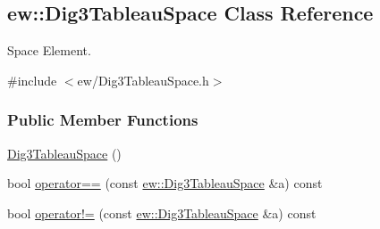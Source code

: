 \hypertarget{classew_1_1Dig3TableauSpace}{
\subsection{ew::Dig3TableauSpace Class Reference}
\label{classew_1_1Dig3TableauSpace}
}


Space Element.  




{\ttfamily \#include $<$ew/Dig3TableauSpace.h$>$}

\subsubsection*{Public Member Functions}
\begin{DoxyCompactItemize}
\item 
\hyperlink{classew_1_1Dig3TableauSpace_a82bcfb4842d1cde423f09731a2d6779b}{Dig3TableauSpace} ()
\item 
bool \hyperlink{classew_1_1Dig3TableauSpace_ade4aa56a4d3987c668b2cf17241ca15a}{operator==} (const \hyperlink{classew_1_1Dig3TableauSpace}{ew::Dig3TableauSpace} \&a) const 
\item 
bool \hyperlink{classew_1_1Dig3TableauSpace_ae968e6859c383ca24abfebce7c5ae567}{operator!=} (const \hyperlink{classew_1_1Dig3TableauSpace}{ew::Dig3TableauSpace} \&a) const 
\end{DoxyCompactItemize}

